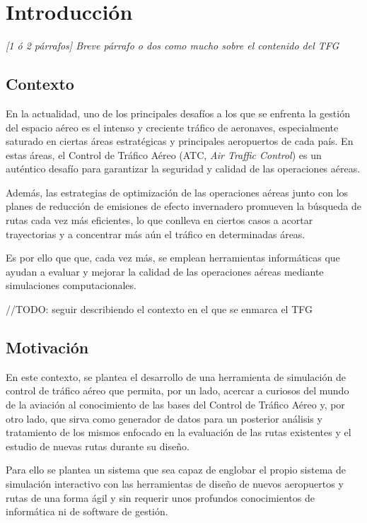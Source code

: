 \chapter{Introducción}
\label{sec:intro}

\textit{[1 ó 2 párrafos] Breve párrafo o dos como mucho sobre el contenido del TFG}

\section{Contexto}
\label{sec:contexto}

En la actualidad, uno de los principales desafíos a los que se enfrenta la gestión del espacio aéreo es el intenso y creciente tráfico de aeronaves, especialmente saturado en ciertas áreas estratégicas y principales aeropuertos de cada país. En estas áreas, el Control de Tráfico Aéreo (ATC, \textit{Air Traffic Control}) es un auténtico desafío para garantizar la seguridad y calidad de las operaciones aéreas.

Además, las estrategias de optimización de las operaciones aéreas junto con los planes de reducción de emisiones de efecto invernadero promueven la búsqueda de rutas cada vez más eficientes, lo que conlleva en ciertos casos a acortar trayectorias y a concentrar más aún el tráfico en determinadas áreas.

Es por ello que que, cada vez más, se emplean herramientas informáticas que ayudan a evaluar y mejorar la calidad de las operaciones aéreas mediante simulaciones computacionales.

//TODO: seguir describiendo el contexto en el que se enmarca el TFG

\section{Motivación}
\label{sec:motivación}

En este contexto, se plantea el desarrollo de una herramienta de simulación de control de tráfico aéreo que permita, por un lado, acercar a curiosos del mundo de la aviación al conocimiento de las bases del Control de Tráfico Aéreo y, por otro lado, que sirva como generador de datos para un posterior análisis y tratamiento de los mismos enfocado en la evaluación de las rutas existentes y el estudio de nuevas rutas durante su diseño.

Para ello se plantea un sistema que sea capaz de englobar el propio sistema de simulación interactivo con las herramientas de diseño de nuevos aeropuertos y rutas de una forma ágil y sin requerir unos profundos conocimientos de informática ni de software de gestión.

